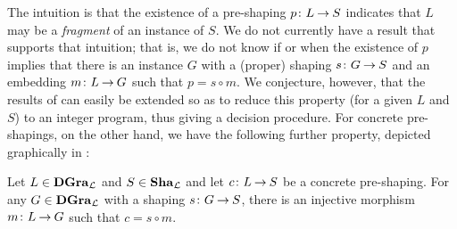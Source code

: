 %
The intuition is that the existence of a pre-shaping $p\colon {L} \mathbin{\rightarrow} {S}$
indicates that $L$ may be a \emph{fragment} of an instance of $S$. We do not
currently have a result that supports that intuition; that is, we do not know
if or when the existence of $p$ implies that there is an instance $G$ with a
(proper) shaping $s\colon {G} \mathbin{\rightarrow} {S}$ and an embedding $m\colon {L} \mathbin{\rightarrow} {G}$ such that
$p=s\circ m$. We conjecture, however, that the results of \cite{Rens04-esop}
can easily be extended so as to reduce this property (for a given $L$ and $S$)
to an integer program, thus giving a decision procedure.
For concrete pre-shapings, on the other hand, we have the following further
property, depicted graphically in :
%
\begin{proposition}
  Let $L\in \mathbf{DGra}_{\cal L}$ and $S\in \mathbf{Sha}_{\cal L}$ and let $c\colon {L} \mathbin{\rightarrow} {S}$ be a
  concrete pre-shaping. For any $G\in \mathbf{DGra}_{\cal L}$ with a shaping $s\colon {G} \mathbin{\rightarrow} {S}$, there is an injective morphism $m\colon {L} \mathbin{\rightarrow} {G}$ such that $c=s\circ m$.
\end{proposition}
%
\begin{wrapfigure}[6]{l}{6.5cm}
\vspace*{-\baselineskip}
\end{wrapfigure}

